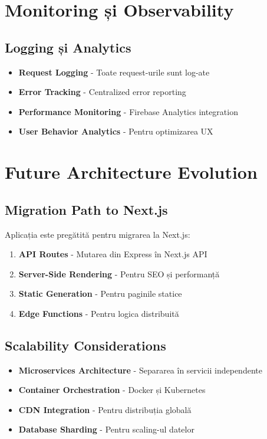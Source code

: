 \documentclass[11pt,a4paper]{article}
\begin{document}
\section{Monitoring și Observability}

\subsection{Logging și Analytics}

\begin{itemize}
    \item \textbf{Request Logging} - Toate request-urile sunt log-ate
    \item \textbf{Error Tracking} - Centralized error reporting
    \item \textbf{Performance Monitoring} - Firebase Analytics integration
    \item \textbf{User Behavior Analytics} - Pentru optimizarea UX
\end{itemize}

\section{Future Architecture Evolution}

\subsection{Migration Path to Next.js}

Aplicația este pregătită pentru migrarea la Next.js:
\begin{enumerate}
    \item \textbf{API Routes} - Mutarea din Express în Next.js API
    \item \textbf{Server-Side Rendering} - Pentru SEO și performanță
    \item \textbf{Static Generation} - Pentru paginile statice
    \item \textbf{Edge Functions} - Pentru logica distribuită
\end{enumerate}

\subsection{Scalability Considerations}

\begin{itemize}
    \item \textbf{Microservices Architecture} - Separarea în servicii independente
    \item \textbf{Container Orchestration} - Docker și Kubernetes
    \item \textbf{CDN Integration} - Pentru distribuția globală
    \item \textbf{Database Sharding} - Pentru scaling-ul datelor
\end{itemize}
\end{document}
